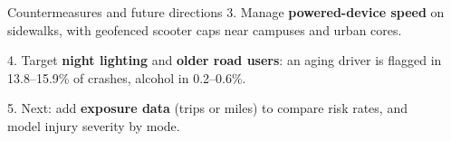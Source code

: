 \documentclass[final]{beamer}
\newlength{\sepwidth}
\newlength{\colwidth}
\newcommand{\separatorcolumn}{\begin{column}{\sepwidth}\end{column}}
\begin{document}
\begin{frame}[t]
\begin{columns}[t]
\begin{column}{\colwidth}
\begin{block}{Countermeasures and future directions}
3. Manage \textcolor{posterblue}{\textbf{powered-device speed}} on sidewalks, with geofenced scooter caps near campuses and urban cores.

4. Target \textcolor{posterblue}{\textbf{night lighting}} and \textcolor{posterblue}{\textbf{older road users}}: an aging driver is flagged in 13.8--15.9\% of crashes, alcohol in 0.2--0.6\%.

5. Next: add \textcolor{posterblue}{\textbf{exposure data}} (trips or miles) to compare risk rates, and model injury severity by mode.
  \end{block}

\end{column}

\separatorcolumn
\end{columns}
\end{frame}
\end{document}
